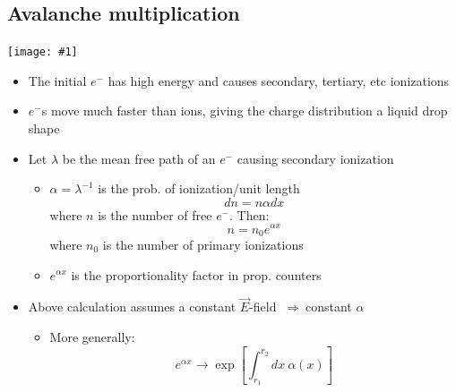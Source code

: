 \documentclass[11pt]{article}
\newcommand{\inv}{^{-1}}
\newcommand{\E}{\ensuremath{\vec{E}}}
\newcommand{\el}{\ensuremath{e^{-}}\xspace}
\newcommand{\thus}{$~\Rightarrow~$}
\newcommand{\embedimg}[1]{\begin{center}\texttt{[image: \#1]}\end{center}}
\begin{document}
\subsection{Avalanche multiplication}
\embedimg{figs/avalanche.png}
\begin{itemize}
  \item The initial $\el$ has high energy and causes secondary, tertiary, etc ionizations
  \item $\el$s move much faster than ions, giving the charge distribution a liquid drop shape
  \item Let $\lambda$ be the mean free path of an $\el$ causing secondary ionization
  \begin{itemize}
    \item $\alpha = \lambda\inv$ is the prob. of ionization/unit length
    \begin{equation}
      dn = n\alpha dx
    \end{equation}
    where $n$ is the number of free $\el$. Then:
    \begin{equation}
      n = n_0 e^{\alpha x}
    \end{equation}
    where $n_0$ is the number of primary ionizations
    \item $e^{\alpha x}$ is the proportionality factor in prop. counters
  \end{itemize}
  \item Above calculation assumes a constant $\E$-field \thus constant $\alpha$
  \begin{itemize}
    \item More generally:
    \begin{equation}
      e^{\alpha x}\rightarrow \exp \left[\int_{r_1}^{r_2} dx~\alpha(x)\right]
    \end{equation}
  \end{itemize}
\end{itemize}
\end{document}
